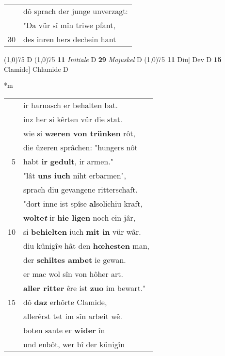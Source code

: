\documentclass[8pt,a4paper,notitlepage]{article}
\begin{document}
\begin{table}[ht]
\begin{minipage}[t]{0.5\linewidth}
\begin{tabular}{rl}
 & dô sprach der junge unverzagt:\\ 
 & "Da vür sî mîn triwe pfant,\\ 
30 & des inren hers dechein hant\\ 
\end{tabular}
\scriptsize
\line(1,0){75} \newline
D \newline
\line(1,0){75} \newline
\textbf{11} \textit{Initiale} D  \textbf{29} \textit{Majuskel} D  \newline
\line(1,0){75} \newline
\textbf{11} Diu] Dev D \textbf{15} Clamide] Chlamide D \newline
\end{minipage}
\hspace{0.5cm}
\begin{minipage}[t]{0.5\linewidth}
\small
\begin{center}*m
\end{center}
\begin{tabular}{rl}
 & ir harnasch er behalten bat.\\ 
 & inz her si kêrten vür die stat.\\ 
 & wie si \textbf{wæren von trünken} rôt,\\ 
 & die ûzeren sprâchen: "hungers nôt\\ 
5 & habt \textbf{ir} \textbf{gedult}, ir armen."\\ 
 & "lât \textbf{uns iuch} niht erbarmen",\\ 
 & sprach diu gevangene ritterschaft.\\ 
 & "dort inne ist spîse \textbf{al}solichiu kraft,\\ 
 & \textbf{wolte\textit{t}} ir \textbf{hie ligen} noch ein jâr,\\ 
10 & si \textbf{behielten} iuch \textbf{mit in} vür wâr.\\ 
 & diu künigî\textit{n} hât den \textbf{hœhesten} man,\\ 
 & der \textbf{schiltes ambet} ie gewan.\\ 
 & er mac wol sîn von hôher art.\\ 
 & \textbf{aller ritter} êre ist \textbf{zuo} im bewart."\\ 
15 & dô \textbf{daz} erhôrte Clamide,\\ 
 & allerêrst tet im sîn arbeit wê.\\ 
 & boten sante er \textbf{wider} în\\ 
 & und enbôt, wer bî der künigîn\\ 

\end{tabular}
\end{minipage}
\end{table}
\end{document}
